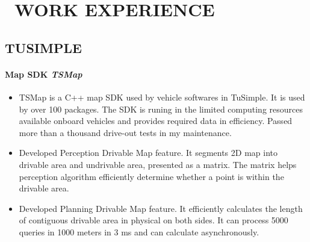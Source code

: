 \section{\faUsers\ WORK EXPERIENCE}


\subsection{TUSIMPLE}
    \paragraph{Map SDK \textit{TSMap}}
        \begin{itemize}
            \item 
                TSMap is a C++ map SDK used by vehicle softwares in TuSimple.
                It is used by over 100 packages.
                The SDK is runing in the limited computing resources available onboard vehicles
                and provides required data in efficiency.
                Passed more than a thousand drive-out tests in my maintenance.
            \item 
                Developed Perception Drivable Map feature.
                It segments 2D map into drivable area and undrivable area, 
                presented as a matrix.
                The matrix helps perception algorithm efficiently determine whether a point is within the drivable area.
            \item 
                Developed Planning Drivable Map feature.
                It efficiently calculates the length of contiguous drivable area in physical on both sides.
                It can process 5000 queries in 1000 meters in 3 ms and can calculate asynchronously.
        \end{itemize}

